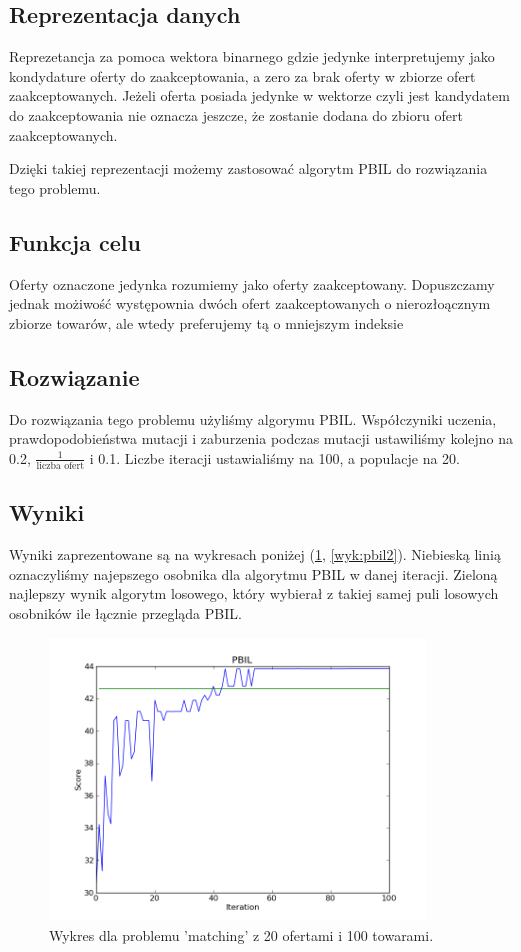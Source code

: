 \subsection{Reprezentacja danych}
Reprezetancja za pomoca wektora binarnego gdzie jedynke interpretujemy jako kondydature oferty do zaakceptowania, a zero za brak oferty w zbiorze ofert zaakceptowanych.
Jeżeli oferta posiada jedynke w wektorze czyli jest kandydatem do zaakceptowania nie oznacza jeszcze, że zostanie dodana do zbioru ofert zaakceptowanych.

Dzięki takiej reprezentacji możemy zastosować algorytm PBIL do rozwiązania tego problemu.

\subsection{Funkcja celu}
Oferty oznaczone jedynka rozumiemy jako oferty zaakceptowany. Dopuszczamy jednak możiwość występownia dwóch ofert zaakceptowanych o nierozłoącznym zbiorze towarów, ale wtedy preferujemy tą o mniejszym indeksie

\subsection{Rozwiązanie}
Do rozwiązania tego problemu użyliśmy algorymu PBIL.
Współczyniki uczenia, prawdopodobieństwa mutacji i zaburzenia podczas mutacji ustawiliśmy kolejno na 0.2, $\frac{1}{\text{liczba ofert}}$ i 0.1.
Liczbe iteracji ustawialiśmy na 100, a populacje na 20.

\subsection{Wyniki}
Wyniki zaprezentowane są na wykresach poniżej (\ref{wyk:pbil1}, \ref{wyk:pbil2}).
Niebieską linią oznaczyliśmy najepszego osobnika dla algorytmu PBIL w danej iteracji. Zieloną najlepszy wynik algorytm losowego, który wybierał z takiej samej puli losowych osobników ile łącznie przegląda PBIL.
\begin{figure}[!ht]
    \centering
    \includegraphics[width=10cm]{wykresy/matching_bids_100_goods_20_0000_txt_pbil.png}
    \caption{Wykres dla problemu 'matching' z 20 ofertami i 100 towarami.}
    \label{wyk:pbil1}
\end{figure}

